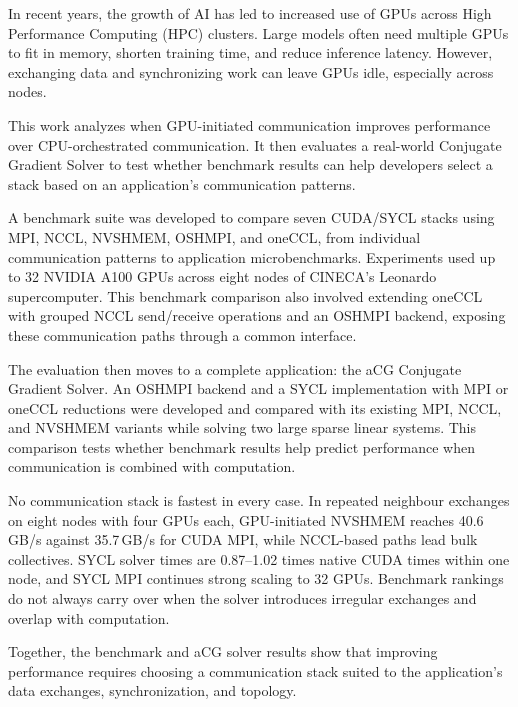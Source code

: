 In recent years, the growth of AI has led to increased use of GPUs across High Performance Computing (HPC) clusters. Large models often need multiple GPUs to fit in memory, shorten training time, and reduce inference latency. However, exchanging data and synchronizing work can leave GPUs idle, especially across nodes.

This work analyzes when GPU-initiated communication improves performance over CPU-orchestrated communication. It then evaluates a real-world Conjugate Gradient Solver to test whether benchmark results can help developers select a stack based on an application's communication patterns.

A benchmark suite was developed to compare seven CUDA/SYCL stacks using MPI, NCCL, NVSHMEM, OSHMPI, and oneCCL, from individual communication patterns to application microbenchmarks. Experiments used up to 32 NVIDIA A100 GPUs across eight nodes of CINECA's Leonardo supercomputer. This benchmark comparison also involved extending oneCCL with grouped NCCL send/receive operations and an OSHMPI backend, exposing these communication paths through a common interface.

The evaluation then moves to a complete application: the aCG Conjugate Gradient Solver. An OSHMPI backend and a SYCL implementation with MPI or oneCCL reductions were developed and compared with its existing MPI, NCCL, and NVSHMEM variants while solving two large sparse linear systems. This comparison tests whether benchmark results help predict performance when communication is combined with computation.

No communication stack is fastest in every case. In repeated neighbour exchanges on eight nodes with four GPUs each, GPU-initiated NVSHMEM reaches 40.6\,GB/s against 35.7\,GB/s for CUDA MPI, while NCCL-based paths lead bulk collectives. SYCL solver times are 0.87--1.02 times native CUDA times within one node, and SYCL MPI continues strong scaling to 32 GPUs. Benchmark rankings do not always carry over when the solver introduces irregular exchanges and overlap with computation.

Together, the benchmark and aCG solver results show that improving performance requires choosing a communication stack suited to the application's data exchanges, synchronization, and topology.

\printkeywords
